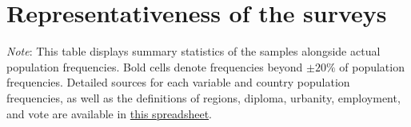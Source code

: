 

\clearpage
\section{Representativeness of the surveys}\label{app:representativeness}

\begin{table}[h!]
    \caption[Sample representativeness in All, Eu, EU]{Sample representativeness overall, in Europe, and in the European Union. %
    } \label{tab:representativeness_0}
    \makebox[\textwidth][c]{
        \resizebox*{!}{.73\textheight}{%
        
        }
    }
    {\footnotesize \textit{Note}: This table displays summary statistics of the samples alongside actual population frequencies. Bold cells denote frequencies beyond $\pm 20\%$ of population frequencies. 
    Detailed sources for each variable and country population frequencies, as well as the definitions of regions, diploma, urbanity, employment, and vote are available in \href{https://github.com/bixiou/robustness_global_redistr/raw/main/questionnaire/sources.xlsx}{this spreadsheet}. 
    } 
\end{table}

%         

